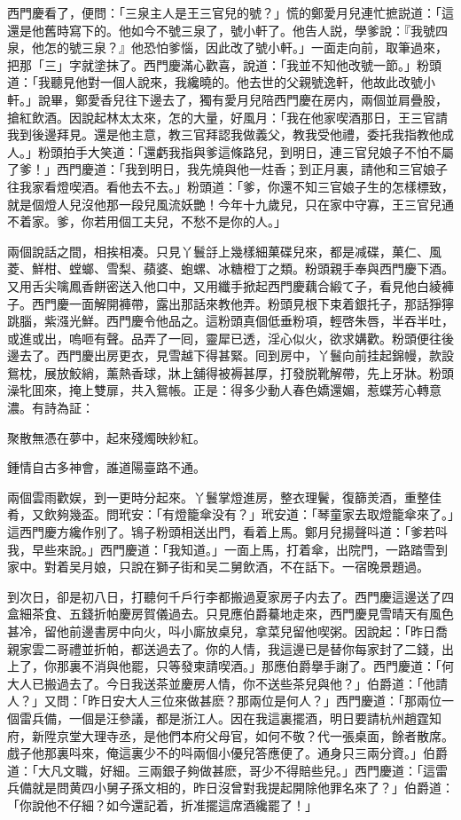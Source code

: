 西門慶看了，便問：「三泉主人是王三官兒的號？」慌的鄭愛月兒連忙摭説道：「這還是他舊時寫下的。他如今不號三泉了，號小軒了。他告人説，學爹說：『我號四泉，他怎的號三泉？』他恐怕爹惱，因此改了號小軒。」一面走向前，取筆過來，把那「三」字就塗抹了。西門慶滿心歡喜，說道：「我並不知他改號一節。」粉頭道：「我聽見他對一個人說來，我纔曉的。他去世的父親號逸軒，他故此改號小軒。」說畢，鄭愛香兒往下邊去了，獨有愛月兒陪西門慶在房内，兩個並肩疊股，搶紅飲酒。因說起林太太來，怎的大量，好風月：「我在他家喫酒那日，王三官請我到後邊拜見。還是他主意，教三官拜認我做義父，教我受他禮，委托我指教他成人。」粉頭拍手大笑道：「還虧我指與爹這條路兒，到明日，連三官兒娘子不怕不屬了爹！」西門慶道：「我到明日，我先燒與他一炷香；到正月裏，請他和三官娘子往我家看燈喫酒。看他去不去。」粉頭道：「爹，你還不知三官娘子生的怎樣標致，就是個燈人兒沒他那一段兒風流妖艷！今年十九歲兒，只在家中守寡，王三官兒通不着家。爹，你若用個工夫兒，不愁不是你的人。」

兩個說話之間，相挨相凑。只見丫鬟㧱上幾樣細菓碟兒來，都是减碟，菓仁、風菱、鮮柑、螳螂、雪梨、蘋婆、蚫螺、冰糖橙丁之類。粉頭親手奉與西門慶下酒。又用舌尖噙鳳香餅密送入他口中，又用纖手掀起西門慶藕合緞て子，看見他白綾褲子。西門慶一面解開褲帶，露出那話來教他弄。粉頭見根下束着銀托子，那話猙獰跳腦，紫漒光鮮。西門慶令他品之。這粉頭真個低垂粉項，輕啓朱唇，半吞半吐，或進或出，嗚咂有聲。品弄了一囘，靈犀已透，淫心似火，欲求媾歡。粉頭便往後邊去了。西門慶出房更衣，見雪越下得甚緊。囘到房中，丫鬟向前挂起錦幔，款設鴛枕，展放鮫綃，薰熱香球，牀上舖得被褥甚厚，打發脱靴解帶，先上牙牀。粉頭澡牝囬來，掩上雙扉，共入鴛帳。正是：得多少動人春色嬌還媚，惹蝶芳心轉意濃。有詩為証：

\begin{myquote}
聚散無憑在夢中，起來殘燭映紗紅。

鍾情自古多神會，誰道陽臺路不通。
\end{myquote}

兩個雲雨歡娱，到一更時分起來。丫鬟掌燈進房，整衣理鬢，復篩羙酒，重整佳肴，又飲夠幾盃。問玳安：「有燈籠傘没有？」玳安道：「琴童家去取燈籠傘來了。」這西門慶方纔作别了。鴇子粉頭相送出門，看着上馬。鄭月兒揚聲呌道：「爹若呌我，早些來說。」西門慶道：「我知道。」一面上馬，打着傘，出院門，一路踏雪到家中。對着吴月娘，只說在獅子街和吴二舅飲酒，不在話下。一宿晚景題過。

到次日，卻是初八日，打聽何千戶行李都搬過夏家房子内去了。西門慶這邊送了四盒細茶食、五錢折帕慶房賀儀過去。只見應伯爵驀地走來，西門慶見雪晴天有風色甚冷，留他前邊書房中向火，呌小廝放桌兒，拿菜兒留他喫粥。因說起：「昨日喬親家雲二哥禮並折帕，都送過去了。你的人情，我這邊已是替你每家封了二錢，出上了，你那裏不消與他罷，只等發柬請喫酒。」那應伯爵擧手謝了。西門慶道：「何大人已搬過去了。今日我送茶並慶房人情，你不送些茶兒與他？」伯爵道：「他請人？」又問：「昨日安大人三位來做甚麽？那兩位是何人？」西門慶道：「那兩位一個雷兵備，一個是汪參議，都是浙江人。因在我這裏擺酒，明日要請杭州趙霆知府，新陞京堂大理寺丞，是他們本府父母官，如何不敬？代一張桌面，餘者散席。戲子他那裏呌來，俺這裏少不的呌兩個小優兒答應便了。通身只三兩分資。」伯爵道：「大凡文職，好細。三兩銀子夠做甚麽，哥少不得賠些兒。」西門慶道：「這雷兵備就是問黄四小舅子孫文相的，昨日沒曾對我提起開除他罪名來了？」伯爵道：「你說他不仔細？如今還記着，折准擺這席酒纔罷了！」

